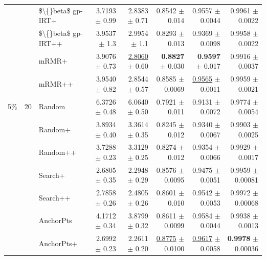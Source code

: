 \begin{longtable}{llp{}rrrrr}
 &  & \$\textbackslash\{\}beta\$ gp-IRT+ & 3.7193 {\scriptsize $\pm$ 0.99} & 2.8383 {\scriptsize $\pm$ 0.71} & 0.8542 {\scriptsize $\pm$ 0.014} & 0.9557 {\scriptsize $\pm$ 0.0044} & 0.9961 {\scriptsize $\pm$ 0.0022} \\
 &  & \$\textbackslash\{\}beta\$ gp-IRT++ & 3.9537 {\scriptsize $\pm$ 1.3} & 2.9954 {\scriptsize $\pm$ 1.1} & 0.8293 {\scriptsize $\pm$ 0.013} & 0.9369 {\scriptsize $\pm$ 0.0098} & 0.9958 {\scriptsize $\pm$ 0.0022} \\
 &  & mRMR+ & 3.9076 {\scriptsize $\pm$ 0.73} & \underline{2.8060} {\scriptsize $\pm$ 0.60} & \textbf{0.8827} {\scriptsize $\pm$ 0.030} & \textbf{0.9597} {\scriptsize $\pm$ 0.017} & 0.9916 {\scriptsize $\pm$ 0.0037} \\
 &  & mRMR++ & 3.9540 {\scriptsize $\pm$ 0.82} & 2.8544 {\scriptsize $\pm$ 0.57} & 0.8585 {\scriptsize $\pm$ 0.0069} & \underline{0.9565} {\scriptsize $\pm$ 0.0011} & 0.9959 {\scriptsize $\pm$ 0.0021} \\
\midrule
5\% & 20 & Random & 6.3726 {\scriptsize $\pm$ 0.48} & 6.0640 {\scriptsize $\pm$ 0.50} & 0.7921 {\scriptsize $\pm$ 0.011} & 0.9131 {\scriptsize $\pm$ 0.0072} & 0.9774 {\scriptsize $\pm$ 0.0054} \\
 &  & Random+ & 3.8934 {\scriptsize $\pm$ 0.40} & 3.3614 {\scriptsize $\pm$ 0.35} & 0.8245 {\scriptsize $\pm$ 0.012} & 0.9340 {\scriptsize $\pm$ 0.0067} & 0.9903 {\scriptsize $\pm$ 0.0025} \\
 &  & Random++ & 3.7288 {\scriptsize $\pm$ 0.23} & 3.3129 {\scriptsize $\pm$ 0.25} & 0.8274 {\scriptsize $\pm$ 0.012} & 0.9354 {\scriptsize $\pm$ 0.0066} & 0.9929 {\scriptsize $\pm$ 0.0017} \\
 &  & Search+ & 2.6805 {\scriptsize $\pm$ 0.35} & 2.2948 {\scriptsize $\pm$ 0.29} & 0.8576 {\scriptsize $\pm$ 0.0095} & 0.9475 {\scriptsize $\pm$ 0.0051} & 0.9959 {\scriptsize $\pm$ 0.00081} \\
 &  & Search++ & 2.7858 {\scriptsize $\pm$ 0.26} & 2.4805 {\scriptsize $\pm$ 0.26} & 0.8601 {\scriptsize $\pm$ 0.010} & 0.9542 {\scriptsize $\pm$ 0.0053} & 0.9972 {\scriptsize $\pm$ 0.00068} \\
 &  & AnchorPts & 4.1712 {\scriptsize $\pm$ 0.34} & 3.8799 {\scriptsize $\pm$ 0.32} & 0.8611 {\scriptsize $\pm$ 0.0099} & 0.9584 {\scriptsize $\pm$ 0.0044} & 0.9938 {\scriptsize $\pm$ 0.0013} \\
 &  & AnchorPts+ & 2.6992 {\scriptsize $\pm$ 0.23} & 2.2611 {\scriptsize $\pm$ 0.20} & \underline{0.8775} {\scriptsize $\pm$ 0.0100} & \underline{0.9617} {\scriptsize $\pm$ 0.0058} & \textbf{0.9978} {\scriptsize $\pm$ 0.00036} \\

\end{longtable}

